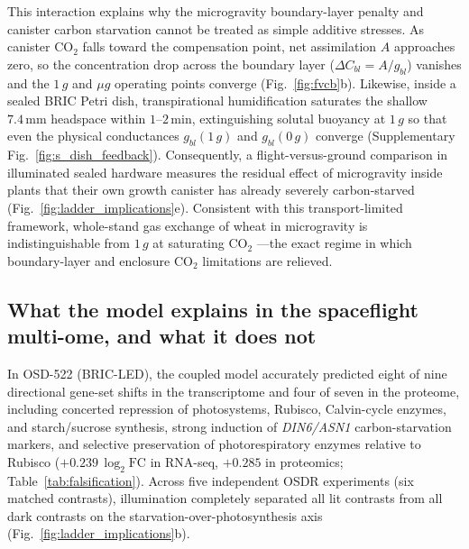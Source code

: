\documentclass[10pt,twocolumn,a4paper]{article}
\begin{document}
This interaction explains why the microgravity boundary-layer penalty and canister carbon starvation cannot be treated as simple additive stresses. As canister $\mathrm{CO_2}$ falls toward the compensation point, net assimilation $A$ approaches zero, so the concentration drop across the boundary layer ($\Delta C_{bl} = A/g_{bl}$) vanishes and the $1\,g$ and $\mu g$ operating points converge (Fig.~\ref{fig:fvcb}b). Likewise, inside a sealed BRIC Petri dish, transpirational humidification saturates the shallow $7.4\,\mathrm{mm}$ headspace within $1\text{--}2\,\mathrm{min}$, extinguishing solutal buoyancy at $1\,g$ so that even the physical conductances $g_{bl}(1\,g)$ and $g_{bl}(0\,g)$ converge (Supplementary Fig.~\ref{fig:s_dish_feedback}). Consequently, a flight-versus-ground comparison in illuminated sealed hardware measures the residual effect of microgravity inside plants that their own growth canister has already severely carbon-starved (Fig.~\ref{fig:ladder_implications}e). Consistent with this transport-limited framework, whole-stand gas exchange of wheat in microgravity is indistinguishable from $1\,g$ at saturating $\mathrm{CO_2}$ \citep{monje2005}---the exact regime in which boundary-layer and enclosure $\mathrm{CO_2}$ limitations are relieved.

\subsection*{What the model explains in the spaceflight multi-ome, and what it does not}

In OSD-522 (BRIC-LED), the coupled model accurately predicted eight of nine directional gene-set shifts in the transcriptome and four of seven in the proteome, including concerted repression of photosystems, Rubisco, Calvin-cycle enzymes, and starch/sucrose synthesis, strong induction of \textit{DIN6/ASN1} carbon-starvation markers, and selective preservation of photorespiratory enzymes relative to Rubisco ($+0.239\,\log_2\mathrm{FC}$ in RNA-seq, $+0.285$ in proteomics; Table~\ref{tab:falsification}). Across five independent OSDR experiments (six matched contrasts), illumination completely separated all lit contrasts from all dark contrasts on the starvation-over-photosynthesis axis (Fig.~\ref{fig:ladder_implications}b).
\end{document}
